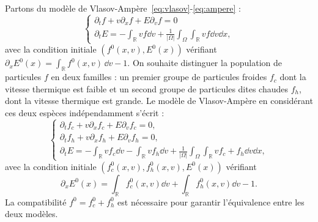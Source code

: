 Partons du modèle de Vlasov-Ampère~\eqref{eq:vlasov}-\eqref{eq:ampere} :
$$
  \begin{cases}
    \partial_t f + v\partial_x f + E\partial_v f = 0 \\
    \partial_t E = -\int_{\mathbb{R}} vf \dd{v} + \frac{1}{|\Omega|}\int_\Omega \int_{\mathbb{R}} vf \dd{v} \dd{x},
  \end{cases}
$$
avec la condition initiale $(f^0(x, v), E^0(x))$ vérifiant $\partial_x E^{0}(x) = \int_{\mathbb{R}} f^0(x, v)\,\dd{v}-1$. On souhaite distinguer la population de particules $f$ en deux familles : un premier groupe de particules froides $f_c$ dont la vitesse thermique est faible et un second groupe de particules dites chaudes $f_h$, dont la vitesse thermique est grande. Le modèle de Vlasov-Ampère en considérant ces deux espèces indépendamment s'écrit :
$$
  \begin{cases}
    \partial_t f_c + v\partial_x f_c + E\partial_v f_c = 0,  \\
    \partial_t f_h + v\partial_x f_h + E\partial_v f_h = 0,  \\
    \partial_t E = -\int_{\mathbb{R}} vf_c \dd{v} -\int_{\mathbb{R}} vf_h \dd{v}+ \frac{1}{|\Omega|}\int_\Omega \int_{\mathbb{R}} vf_c+f_h \dd{v}  \dd{x}, 
  \end{cases}
$$
avec la condition initiale $(f^0_{c}(x, v), f^0_{h}(x, v), E^0(x))$ vérifiant
$$
\partial_x E^0(x) = \int_{\mathbb{R}} f^0_{c}(x, v) \dd{v}+\int_{\mathbb{R}} f^0_{h}(x, v) \dd{v}-1.
$$ 
La compatibilité $f^0 = f^0_{c} + f^0_{h}$ est nécessaire pour garantir l'équivalence entre les deux modèles.

